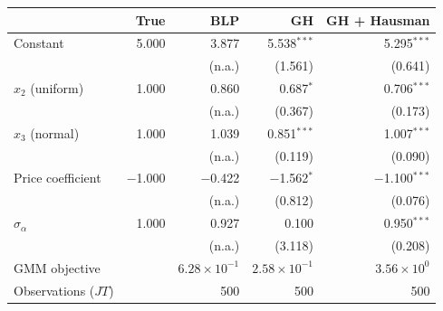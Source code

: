 \begin{tabular}{lrrrr}
\toprule
 & True & BLP & GH & GH + Hausman \\
\midrule
Constant & 5.000 & 3.877 & 5.538$^{***}$ & 5.295$^{***}$ \\
 &  & (n.a.) & (1.561) & (0.641) \\
$x_2$ (uniform) & 1.000 & 0.860 & 0.687$^{*}$ & 0.706$^{***}$ \\
 &  & (n.a.) & (0.367) & (0.173) \\
$x_3$ (normal) & 1.000 & 1.039 & 0.851$^{***}$ & 1.007$^{***}$ \\
 &  & (n.a.) & (0.119) & (0.090) \\
Price coefficient & $-$1.000 & $-$0.422 & $-$1.562$^{*}$ & $-$1.100$^{***}$ \\
 &  & (n.a.) & (0.812) & (0.076) \\
$\sigma_\alpha$ & 1.000 & 0.927 & 0.100 & 0.950$^{***}$ \\
 &  & (n.a.) & (3.118) & (0.208) \\
\midrule
GMM objective &  & $6.28\times10^{-1}$ & $2.58\times10^{-1}$ & $3.56\times10^{0}$ \\
Observations ($JT$) &  & 500 & 500 & 500 \\
\bottomrule
\end{tabular}
